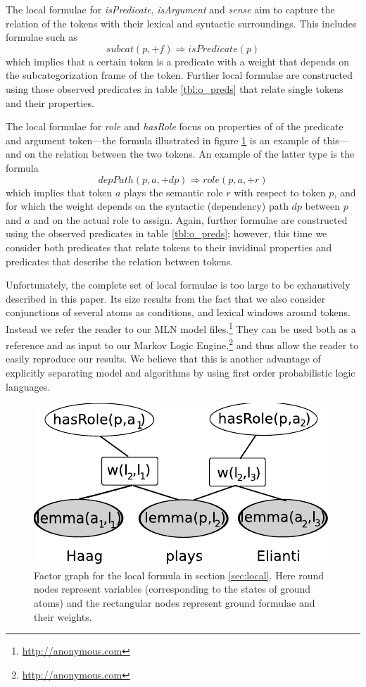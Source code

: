 The local formulae for \emph{isPredicate}, \emph{isArgument} and \emph{sense} aim to capture the relation of the tokens with their lexical and syntactic surroundings. This includes formulae such as 
\[subcat(p,+f) \Rightarrow isPredicate(p)\]
which implies that a certain token is a predicate with a weight that depends on the subcategorization frame of the token. Further local formulae are constructed using those observed predicates in table \ref{tbl:o_preds} that relate single tokens and their properties.

The local formulae for \emph{role} and \emph{hasRole} focus on properties of of the predicate and argument token---the formula illustrated in figure \ref{fig:local2} is an example of this---and on the relation between the two tokens. An example of the latter type is the formula
\[depPath(p,a,+dp) \Rightarrow role(p,a,+r)\]
which implies that token $a$ plays the semantic role $r$ with respect to token $p$, and for which the weight depends on the syntactic (dependency) path $dp$ between $p$ and $a$ and on the actual role to assign. Again, further formulae are constructed using the observed predicates in table \ref{tbl:o_preds}; however, this time we consider both predicates that relate tokens to their invidiual properties and predicates that describe the relation between tokens.

Unfortunately, the complete set of local formulae is too large to be exhaustively described in this paper. Its size results from the fact that we also consider conjunctions of several atoms as conditions, and lexical windows around tokens. Instead we refer the reader
to our MLN model files.\footnote{\url{http://anonymous.com}} They can be used both as a reference and as input to our Markov Logic
Engine,\footnote{\url{http://anonymous.com}} and thus allow the reader to easily reproduce our results. We believe that this is another advantage
of explicitly separating model and algorithms by using first order probabilistic logic languages.

\begin{figure}
\begin{center}
    \includegraphics[scale=.70]{LocalFormula2}
\end{center}
\caption{Factor graph for the local formula in section \ref{sec:local}. Here round nodes represent variables (corresponding to the states of ground atoms) and the rectangular nodes represent ground formulae and their weights.}
\label{fig:local2}
\end{figure}

